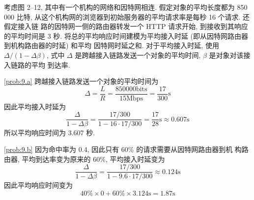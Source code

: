 \documentclass[boxes]{homework}
\begin{document}
\begin{problem}
考虑图 2--12, 其中有一个机构的网络和因特网相连. 假定对象的平均长度都为 850 000
比特, 从这个机构网的浏览器到初始服务器的平均请求率是每秒 16 个请求. 还假定接入链
路的因特网一侧的路由器转发一个 HTTP 请求开始, 到接收到其响应的平均时间是 3 秒.
将总的平均响应时间建模为平均接入时延 (即从因特网路由器到机构路由器的时延) 和平均
因特网时延之和. 对于平均接入时延, 使用 $\Delta / (1 - \Delta\beta)$, 式中
$\Delta$ 是跨越接入链路发送一个对象的平均时间, $\beta$ 是对象对该接入链路的平均
到达率.
\end{problem}
\begin{solution}
    \ref{prob:9.a} 跨越接入链路发送一个对象的平均时间为
    \begin{equation}
        \Delta = \frac{ L }{ R } = \frac{ 850000\text{bits} }
        { 15\text{Mbps} } = \frac{ 17 }{ 300 } \text{s}
    \end{equation}
    因此平均接入时延为
    \begin{equation}
        \frac{ \Delta }{ 1 - \Delta\beta } = \frac{ 17 / 300 }{ 1 - 16 \cdot 17
            / 300} = \frac{ 17 }{ 28 }\text{s} \approx 0.607\text{s}
    \end{equation}
    所以平均响应时间为 3.607 秒.

    \ref{prob:9.b} 因为命中率为 0.4, 因此只有 60\% 的请求需要从因特网路由器到机
    构路由器, 平均到达率变为原来的 60\%, 平均接入时延变为
    \begin{equation}
        \frac{ \Delta }{ 1 - \Delta\beta } = \frac{ 17 / 300 }{ 1 - 9.6 \cdot 17
            / 300} \approx 0.124\text{s}
    \end{equation}
    因此平均响应时间变为
    \begin{equation}
        40\% \times 0 + 60\% \times 3.124\text{s} = 1.87\text{s}
    \end{equation}
\end{solution}
\end{document}
